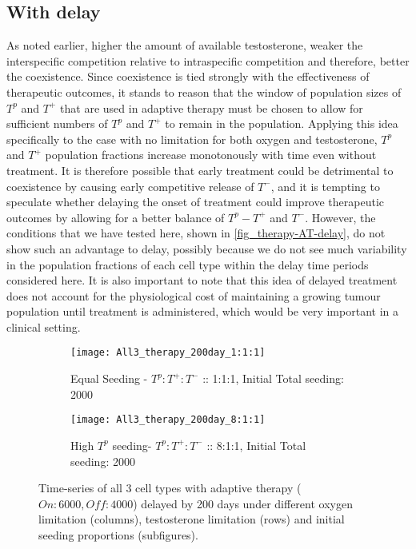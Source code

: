 \newpage

\subsection{With delay}
As noted earlier, higher the amount of available testosterone, weaker the interspecific competition relative to intraspecific competition and therefore, better the coexistence. Since coexistence is tied strongly with the effectiveness of therapeutic outcomes, it stands to reason that the window of population sizes of $T^p$ and $T^+$ that are used in adaptive therapy must be chosen to allow for sufficient numbers of $T^p$ and $T^+$ to remain in the population. Applying this idea specifically to the case with no limitation for both oxygen and testosterone, $T^p$ and $T^+$ population fractions increase monotonously with time even without treatment. It is therefore possible that early treatment could be detrimental to coexistence by causing early competitive release of $T^-$, and it is tempting to speculate whether delaying the onset of treatment could improve therapeutic outcomes by allowing for a better balance of $T^p - T^+$ and $T^-$. However, the conditions that we have tested here, shown in \autoref{fig_therapy-AT-delay}, do not show such an advantage to delay, possibly because we do not see much variability in the population fractions of each cell type within the delay time periods considered here. It is also important to note that this idea of delayed treatment does not account for the physiological cost of maintaining a growing tumour population until treatment is administered, which would be very important in a clinical setting.

\begin{figure}
  \centering
  \begin{subfigure}[b]{\textwidth}
    \centering
    \texttt{[image: All3\_therapy\_200day\_1:1:1]}
    \caption{Equal Seeding - $T^p:T^+:T^-$ :: 1:1:1, Initial Total seeding: 2000}
    \label{fig_therapy-AT-delay200_1:1:1-2000}
  \end{subfigure}
  \begin{subfigure}[b]{\textwidth}
    \centering
    \texttt{[image: All3\_therapy\_200day\_8:1:1]}
    \caption{High $T^p$ seeding- $T^p:T^+:T^-$ :: 8:1:1, Initial Total seeding: 2000}
    \label{fig_therapy-AT-delay200_8:1:1-2000}
  \end{subfigure}
  \caption[Time-series of all 3 cell types with delayed adaptive therapy]{Time-series of all 3 cell types with adaptive therapy ($On:6000, Off:4000$) delayed by 200 days under different oxygen limitation (columns), testosterone limitation (rows) and initial seeding proportions (subfigures).}
  \label{fig_therapy-AT-delay}
\end{figure}

